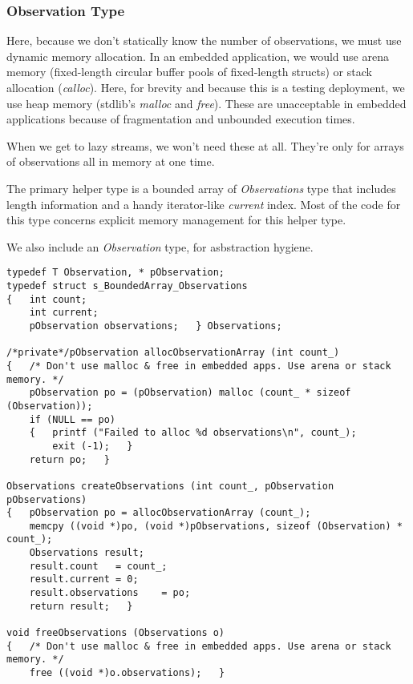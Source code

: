 \documentclass[10pt,oneside,x11names]{article}
\begin{document}
\subsubsection{Observation Type}
\label{sec:orgheadline3}

Here, because we don't statically know the number of observations, we must use
dynamic memory allocation. In an embedded application, we would use arena memory
(fixed-length circular buffer pools of fixed-length structs) or stack allocation
(\emph{calloc}). Here, for brevity and because this is a testing deployment, we use
heap memory (stdlib's \emph{malloc} and \emph{free}). These are unacceptable in embedded
applications because of fragmentation and unbounded execution times.

When we get to lazy streams, we won't need these at all. They're only for arrays
of observations all in memory at one time.

The primary helper type is a bounded array of \emph{Observations} type that includes
length information and a handy iterator-like \emph{current} index. Most of the code
for this type concerns explicit memory management for this helper type.

We also include an \emph{Observation} type, for asbstraction hygiene. 

\begin{verbatim}
typedef T Observation, * pObservation;
typedef struct s_BoundedArray_Observations
{   int count;
    int current;
    pObservation observations;   } Observations;

/*private*/pObservation allocObservationArray (int count_)
{   /* Don't use malloc & free in embedded apps. Use arena or stack memory. */
    pObservation po = (pObservation) malloc (count_ * sizeof (Observation));
    if (NULL == po)
    {   printf ("Failed to alloc %d observations\n", count_);
        exit (-1);   }
    return po;   }

Observations createObservations (int count_, pObservation pObservations)
{   pObservation po = allocObservationArray (count_);
    memcpy ((void *)po, (void *)pObservations, sizeof (Observation) * count_);
    Observations result;
    result.count   = count_;
    result.current = 0;
    result.observations    = po;
    return result;   }

void freeObservations (Observations o)
{   /* Don't use malloc & free in embedded apps. Use arena or stack memory. */
    free ((void *)o.observations);   }
\end{verbatim}
\end{document}
